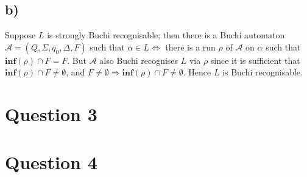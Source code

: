 \documentclass[11pt]{article}
\begin{document}
\subsection*{b)}

Suppose $L$ is strongly Buchi recognisable; then there is a Buchi automaton $\mathcal{A} = (Q, \Sigma, q_0, \Delta, F)$ such that $\alpha \in L \iff $ there is a run $\rho$ of $\mathcal{A}$ on $\alpha$ such that $\textbf{inf}(\rho) \cap F = F$. But $\mathcal{A}$ also Buchi recognises $L$ via $\rho$ since it is sufficient that $\textbf{inf}(\rho) \cap F \neq \emptyset$, and $F \neq \emptyset \Rightarrow \textbf{inf}(\rho) \cap F \neq \emptyset$. Hence $L$ is Buchi recognisable.

\section*{Question 3}

\section*{Question 4}

{}

\end{document}
